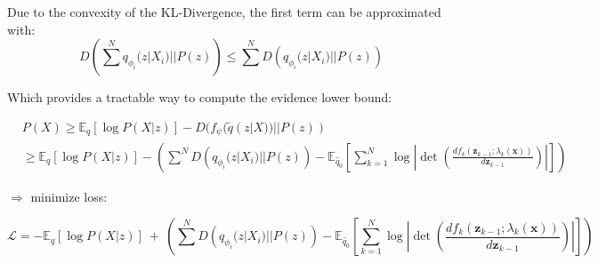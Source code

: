 \documentclass[11pt]{article}
\begin{document}
    Due to the convexity of the KL-Divergence, the first term can be approximated with:
    \begin{equation}
        D \left(\sum ^N q_{\phi_{i}} (z | X_i) || P(z) \right) \leq \sum ^N D \left( q_{\phi_{i}} (z | X_i) || P(z) \right)
    \end{equation}

    Which provides a tractable way to compute the evidence lower bound:

    \begin{equation}
        \begin{split}
            &P(X) \geq \mathbb{E}_q [\log P(X|z)] - D(f_{\psi}(\tilde{q}(z|X)) ||P(z))\\
            & \geq \mathbb{E}_q [\log P(X|z)] - \left(  \sum ^N D \left( q_{\phi_{i}} (z | X_i) || P(z) \right) - \mathbb{E}_{\tilde{q_{0}}}\left[ \sum_{k=1}^{N} \log \left| \det \left( \frac{d f_k (\textbf{z}_{k-1}; \lambda_k (\textbf{x}))}{d\textbf{z}_{k-1}} \right) \right| \right]  \right)
        \end{split}
    \end{equation}

    $\Rightarrow$ minimize loss:

    \begin{equation}
        \mathcal{L} = - \mathbb{E}_q [\log P(X|z)] \ + \ \left(  \sum ^N D \left( q_{\phi_{i}} (z | X_i) || P(z) \right) - \mathbb{E}_{\tilde{q_{0}}}\left[ \sum_{k=1}^{N} \log \left| \det \left( \frac{d f_k (\textbf{z}_{k-1}; \lambda_k (\textbf{x}))}{d\textbf{z}_{k-1}} \right) \right| \right]  \right)
    \end{equation}

    \printbibliography
\end{document}
